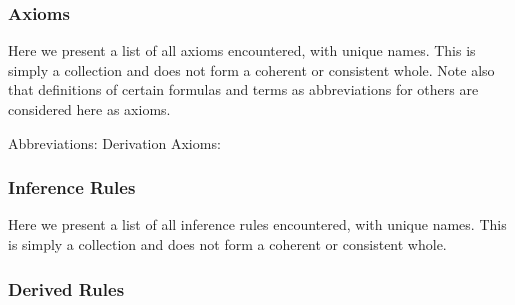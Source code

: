 \subsubsection{Axioms}

Here we present a list of all axioms encountered,
with unique names.
This is simply a collection and does not form a coherent
or consistent whole.
Note also that definitions of certain formulas and terms
as abbreviations for others are considered here as axioms.

Abbreviations:
Derivation Axioms:

\subsubsection{Inference Rules}

Here we present a list of all inference rules encountered,
with unique names.
This is simply a collection and does not form a coherent
or consistent whole.

\subsubsection{Derived Rules}

